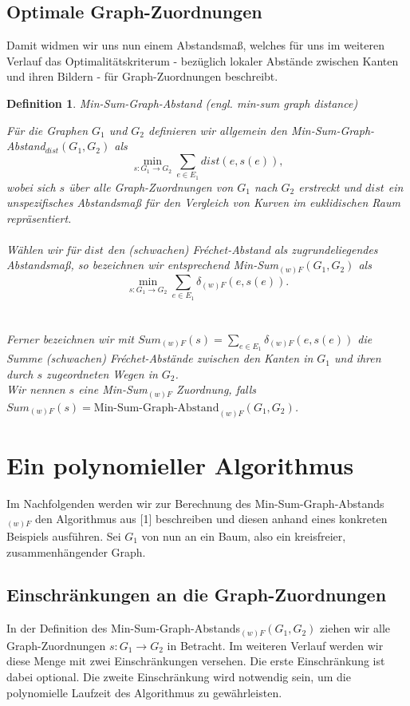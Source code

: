 \documentclass[a4paper, 12pt, twoside]{article}
\theoremstyle{Format1} %
\newtheorem{Def}{Definition}[section]       %
\begin{document}
\subsection{Optimale Graph-Zuordnungen}
Damit widmen wir uns nun einem Abstandsmaß, welches für uns im weiteren Verlauf das Optimalitätskriterum - bezüglich lokaler Abstände zwischen Kanten und ihren Bildern - für Graph-Zuordnungen beschreibt.

\begin{Def} \label{Definition Min-Sum}
	Min-Sum-Graph-Abstand (engl. min-sum graph distance)

	Für die Graphen $G_1$ und $G_2$ definieren wir allgemein den \textit{Min-Sum-Graph-Abstand}$_{dist}(G_1, G_2)$ als
	$$\min_{s: G_1 \to G_2} \sum_{e \in E_1} dist(e, s(e)),$$
	wobei sich $s$ über alle Graph-Zuordnungen von $G_1$ nach $G_2$ erstreckt und $dist$ ein unspezifisches Abstandsmaß für den Vergleich von Kurven im euklidischen Raum repräsentiert.
	\\
	\\
	Wählen wir für $dist$ den (schwachen) Fréchet-Abstand als zugrundeliegendes Abstandsmaß, so bezeichnen wir entsprechend
	\textit{Min-Sum}$_{(w)F}(G_1, G_2)$ als $$\min_{s: G_1 \to G_2} \sum_{e \in E_1} \delta_{(w)F}(e, s(e)).$$
	\\
	\\
	Ferner bezeichnen wir mit $Sum_{(w)F}(s) = \sum_{e \in E_1}\delta_{(w)F}(e, s(e))$ die Summe (schwachen) Fréchet-Abstände zwischen den Kanten
	in $G_1$ und ihren durch $s$ zugeordneten Wegen in $G_2$.
	\\
	Wir nennen $s$ eine Min-Sum$_{(w)F}$ Zuordnung, falls
	\\
	$Sum_{(w)F}(s) = \text{Min-Sum-Graph-Abstand}_{(w)F}(G_1,G_2)$.

\end{Def}

\section{Ein polynomieller Algorithmus}

Im Nachfolgenden werden wir zur Berechnung des Min-Sum-Graph-Abstands$_{(w)F}$ den Algorithmus aus [1] beschreiben und diesen anhand eines konkreten Beispiels ausführen.
Sei $G_1$ von nun an ein Baum, also ein kreisfreier, zusammenhängender Graph.

\subsection{Einschränkungen an die Graph-Zuordnungen} \label{Einschränkungen}
In der Definition des Min-Sum-Graph-Abstands$_{(w)F}(G_1, G_2)$ ziehen wir alle Graph-Zuordnungen $s: G_1 \to G_2$ in Betracht.
Im weiteren Verlauf werden wir diese Menge mit zwei Einschränkungen versehen.
Die erste Einschränkung ist dabei optional. Die zweite Einschränkung wird notwendig sein, um die polynomielle Laufzeit des Algorithmus zu gewährleisten.
\end{document}
